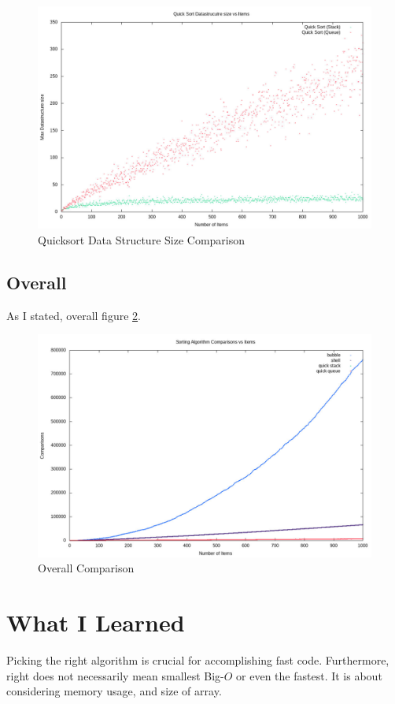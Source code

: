 \documentclass[12pt]{article}
\begin{document}
	\begin{figure}[H]
		\caption{Quicksort Data Structure Size Comparison}\label{quick_size}
		\includegraphics[width=\textwidth]{quick_comparison_size}
		\centering
	\end{figure}


	\subsection{Overall}

	As I stated, overall figure \ref{comparison}.

	\begin{figure}[H]
		\caption{Overall Comparison}\label{comparison}
		\includegraphics[width=\textwidth]{comparison}
		\centering
	\end{figure}


	\section{What I Learned}

	Picking the right algorithm is crucial for accomplishing fast code. Furthermore, right does not necessarily mean smallest Big-$O$ or even the fastest. It is about considering memory usage, and size of array.

	
\end{document}
